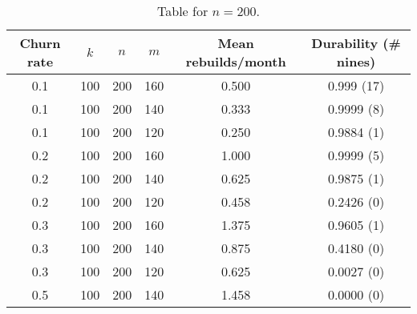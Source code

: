 \begin{table}[H]\centering
\begin{tabular}{| c | c c c | c | c|}\hline
Churn rate &$k$& $n$ & $m$ &Mean rebuilds/month&Durability (\# nines) \\\hline 
0.1 &100& 200 & 160 & 0.500 &0.999 (17)\\  
0.1 &100& 200 & 140 & 0.333 &0.9999 (8)\\  
0.1 &100& 200 & 120 & 0.250 &0.9884 (1)\\\hline 

0.2 &100& 200 & 160 & 1.000 &0.9999 (5)\\  
0.2 &100& 200 & 140 & 0.625 &0.9875 (1)\\  
0.2 &100& 200 & 120 & 0.458 &0.2426 (0)\\\hline

0.3 &100& 200 & 160 & 1.375 &0.9605 (1)\\  
0.3 &100& 200 & 140 & 0.875 &0.4180 (0)\\  
0.3 &100& 200 & 120 & 0.625 &0.0027 (0)\\\hline

0.5 &100& 200 & 140 & 1.458 &0.0000 (0)\\\hline
\end{tabular}
\caption{Table for $n=200$.}\label{table:n=200}
\end{table}